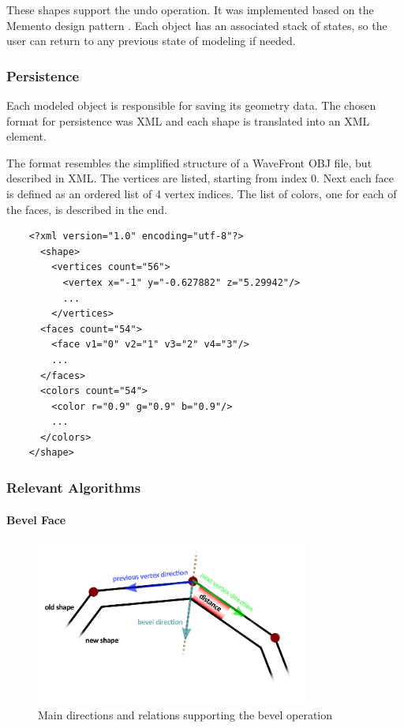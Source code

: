 These shapes support the undo operation. It was implemented based on the Memento design pattern \cite{despat}.
Each object has an associated stack of states, so the user can return to any previous state of modeling if needed.


\subsubsection{Persistence}

Each modeled object is responsible for saving its geometry data.
The chosen format for persistence was XML and each shape is translated into an XML element.

The format resembles the simplified structure of a WaveFront OBJ file, but described in XML.
The vertices are listed, starting from index 0.
Next each face is defined as an ordered list of 4 vertex indices.
The list of colors, one for each of the faces, is described in the end.

\begin{small}
	\begin{verbatim}
	<?xml version="1.0" encoding="utf-8"?>
	  <shape>
	    <vertices count="56">
	      <vertex x="-1" y="-0.627882" z="5.29942"/>
	      ...
	    </vertices>
	  <faces count="54">
	    <face v1="0" v2="1" v3="2" v4="3"/>
	    ...
	  </faces>
	  <colors count="54">
	    <color r="0.9" g="0.9" b="0.9"/>
	    ...
	  </colors>
	</shape>
	\end{verbatim}
\end{small}


\subsubsection{Relevant Algorithms}

\paragraph{Bevel Face}

\begin{figure}[!ht]
    \centering
    \includegraphics[width=9cm]{gfx/bevel.png}
    \vspace{-1cm}
    \caption{Main directions and relations supporting the bevel operation}
    \label{FIG-GS-BEVEL}
\end{figure}

